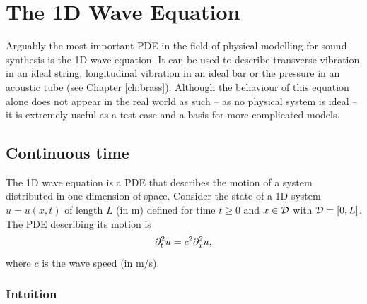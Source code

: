 
    
    
    

\section{%
The 1D Wave Equation}\label{sec:1DWave}
Arguably the most important PDE in the field of physical modelling for sound synthesis is the 1D wave equation. It can be used to describe transverse vibration in an ideal string, longitudinal vibration in an ideal bar or the pressure in an acoustic tube (see Chapter \ref{ch:brass}). Although the behaviour of this equation alone does not appear in the real world as such -- as no physical system is ideal -- it is extremely useful as a test case and a basis for more complicated models. %

\subsection{Continuous time}
The 1D wave equation is a PDE that describes the motion of a system distributed in one dimension of space. Consider the state of a 1D system $u=u(x,t)$ of length $L$ (in m) defined for time $t\geq 0$ and $x\in \mathcal{D}$ with $\mathcal{D} = [0, L]$. The PDE describing its motion is
\begin{equation}\label{eq:1DwavePDE}
    \partial_t^2 u = c^2 \partial_x^2 u,
\end{equation}
where $c$ is the wave speed (in m/s). 

\subsubsection{Intuition}

